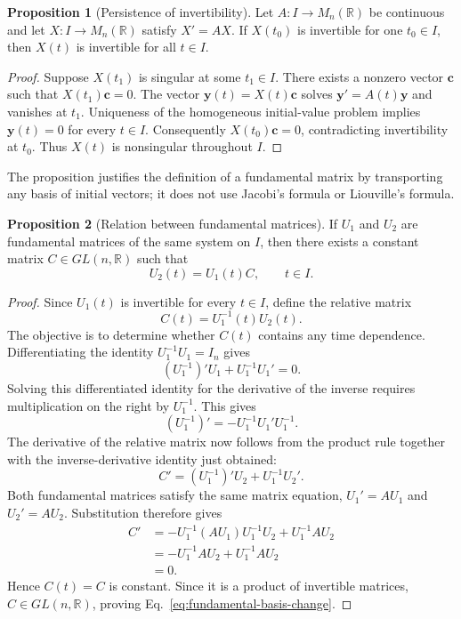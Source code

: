 \documentclass[11pt,a4paper]{article}
\newcommand{\be}{\begin{equation}}
\newcommand{\ee}{\end{equation}}
\newcommand{\lb}[1]{\label{#1}}
\newcommand{\R}{\mathbb{R}}
\theoremstyle{definition}
\newtheorem{proposition}{Proposition}[section]
\numberwithin{equation}{section}
\begin{document}
\begin{proposition}[Persistence of invertibility]\label{prop:invertible}
Let $A:I\to M_n(\R)$ be continuous and let $X:I\to M_n(\R)$ satisfy $X'=AX$. If $X(t_0)$ is invertible for one $t_0\in I$, then $X(t)$ is invertible for all $t\in I$.
\end{proposition}
\begin{proof}
Suppose $X(t_1)$ is singular at some $t_1\in I$. There exists a nonzero vector $\mathbf c$ such that $X(t_1)\mathbf c=0$. The vector $\mathbf y(t)=X(t)\mathbf c$ solves $\mathbf y'=A(t)\mathbf y$ and vanishes at $t_1$. Uniqueness of the homogeneous initial-value problem implies $\mathbf y(t)=0$ for every $t\in I$. Consequently $X(t_0)\mathbf c=0$, contradicting invertibility at $t_0$. Thus $X(t)$ is nonsingular throughout $I$.
\end{proof}
The proposition justifies the definition of a fundamental matrix by transporting any basis of initial vectors; it does not use Jacobi's formula or Liouville's formula.

\begin{proposition}[Relation between fundamental matrices]
If $U_1$ and $U_2$ are fundamental matrices of the same system on $I$, then there exists a constant matrix $C\in GL(n,\R)$ such that
\be
U_2(t)=U_1(t)C,
\qquad t\in I.
\lb{eq:fundamental-basis-change}
\ee
\end{proposition}

\begin{proof}
Since $U_1(t)$ is invertible for every $t\in I$, define the relative matrix
\be
C(t)=U_1^{-1}(t)U_2(t).
\lb{eq:C-relative}
\ee
The objective is to determine whether $C(t)$ contains any time dependence. Differentiating the identity $U_1^{-1}U_1=I_n$ gives
\be
(U_1^{-1})'U_1+U_1^{-1}U_1'=0.
\lb{eq:inverse-derivative-step1}
\ee
Solving this differentiated identity for the derivative of the inverse requires multiplication on the right by $U_1^{-1}$. This gives
\be
(U_1^{-1})'
=-U_1^{-1}U_1'U_1^{-1}.
\lb{eq:inverse-derivative}
\ee
The derivative of the relative matrix now follows from the product rule together with the inverse-derivative identity just obtained:
\be
C'
=(U_1^{-1})'U_2+U_1^{-1}U_2'.
\lb{eq:C-derivative-step1}
\ee
Both fundamental matrices satisfy the same matrix equation, $U_1'=AU_1$ and $U_2'=AU_2$. Substitution therefore gives
\be
\begin{aligned}
C'
&=-U_1^{-1}(AU_1)U_1^{-1}U_2+U_1^{-1}AU_2\\
&=-U_1^{-1}AU_2+U_1^{-1}AU_2\\
&=0.
\end{aligned}
\lb{eq:C-constant}
\ee
Hence $C(t)=C$ is constant. Since it is a product of invertible matrices, $C\in GL(n,\R)$, proving Eq.~\eqref{eq:fundamental-basis-change}.
\end{proof}
\end{document}
